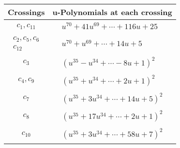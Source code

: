 \documentclass[1p]{elsarticle_modified}
\theoremstyle{definition}
\begin{document}
\begin{tabular}{m{50pt}|m{274pt}}
Crossings & \hspace{64pt}u-Polynomials at each crossing \\
\hline $$\begin{aligned}c_{1},c_{11}\end{aligned}$$&$\begin{aligned}
&u^{70}+41 u^{69}+\cdots+116 u+25
\end{aligned}$\\
\hline $$\begin{aligned}c_{2},c_{5},c_{6}\\c_{12}\end{aligned}$$&$\begin{aligned}
&u^{70}+u^{69}+\cdots+14 u+5
\end{aligned}$\\
\hline $$\begin{aligned}c_{3}\end{aligned}$$&$\begin{aligned}
&(u^{35}- u^{34}+\cdots-8 u+1)^{2}
\end{aligned}$\\
\hline $$\begin{aligned}c_{4},c_{9}\end{aligned}$$&$\begin{aligned}
&(u^{35}+u^{34}+\cdots+2 u+1)^{2}
\end{aligned}$\\
\hline $$\begin{aligned}c_{7}\end{aligned}$$&$\begin{aligned}
&(u^{35}+3 u^{34}+\cdots+14 u+5)^{2}
\end{aligned}$\\
\hline $$\begin{aligned}c_{8}\end{aligned}$$&$\begin{aligned}
&(u^{35}+17 u^{34}+\cdots+2 u+1)^{2}
\end{aligned}$\\
\hline $$\begin{aligned}c_{10}\end{aligned}$$&$\begin{aligned}
&(u^{35}+3 u^{34}+\cdots+58 u+7)^{2}
\end{aligned}$\\
\hline
\end{tabular}\\~\\
\end{document}

